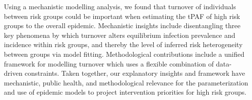 Using a mechanistic modelling analysis,
we found that turnover of individuals between risk groups could be important when
estimating the tPAF of high risk groups to the overall epidemic.
Mechanistic insights include disentangling
three key phenomena by which turnover
alters equilibrium infection prevalence and incidence within risk groups,
and thereby the level of inferred risk heterogeneity between groups via model fitting.
Methodological contributions include a unified framework for modelling turnover
which uses a flexible combination of data-driven constraints.
Taken together, our explanatory insights and framework
have mechanistic, public health, and methodological relevance for
the parameterization and use of epidemic models
to project intervention priorities for high risk groups.
